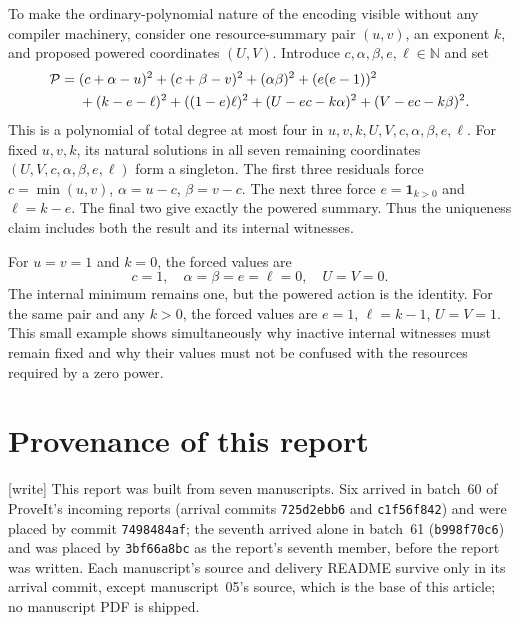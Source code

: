 \documentclass[11pt,a4paper]{article}
\theoremstyle{definition}
\theoremstyle{remark}
\newcommand{\N}{\mathbb N}
\newcommand{\wtag}{\textup{[write]}}%
\begin{document}
To make the ordinary-polynomial nature of the encoding visible without any
compiler machinery, consider one resource-summary pair $(u,v)$, an exponent
$k$, and proposed powered coordinates $(U,V)$. Introduce
$c,\alpha,\beta,e,\ell\in\N$ and set
\begin{align}
\label{cdc:cs:eq:localpoly}
\mathcal P={}&(c+\alpha-u)^2+(c+\beta-v)^2+(\alpha\beta)^2
 +(e(e-1))^2\\
&+(k-e-\ell)^2+((1-e)\ell)^2
 +(U-ec-k\alpha)^2+(V-ec-k\beta)^2.
\notag
\end{align}
This is a polynomial of total degree at most four in
$u,v,k,U,V,c,\alpha,\beta,e,\ell$. For fixed $u,v,k$, its natural solutions
in all seven remaining coordinates $(U,V,c,\alpha,\beta,e,\ell)$ form a
singleton. The first three residuals force
$c=\min(u,v)$, $\alpha=u-c$, $\beta=v-c$. The next three force
$e=\mathbf1_{k>0}$ and $\ell=k-e$. The final two give exactly the powered
summary. Thus the uniqueness claim includes both the result and its internal
witnesses.

For $u=v=1$ and $k=0$, the forced values are
\[
c=1,\quad\alpha=\beta=e=\ell=0,\quad U=V=0.
\]
The internal minimum remains one, but the powered action is the identity.
For the same pair and any $k>0$, the forced values are $e=1$, $\ell=k-1$,
$U=V=1$. This small example shows simultaneously why inactive internal
witnesses must remain fixed and why their values must not be confused with
the resources required by a zero power.

\clearpage

\section{Provenance of this report}\label{cdc:sec:provenance}
\wtag{} This report was built from seven manuscripts. Six arrived in batch~60 of ProveIt's incoming reports (arrival commits \texttt{725d2ebb6} and \texttt{c1f56f842}) and were placed by commit \texttt{7498484af}; the seventh arrived alone in batch~61 (\texttt{b998f70c6}) and was placed by \texttt{3bf66a8bc} as the report's seventh member, before the report was written. Each manuscript's source and delivery README survive only in its arrival commit, except manuscript~05's source, which is the base of this article; no manuscript PDF is shipped.
\end{document}
